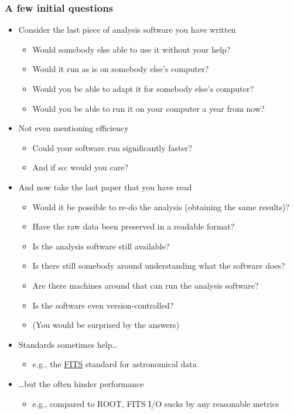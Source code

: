 \documentclass[9pt]{beamer}
\begin{document}
\begin{frame}
  \frametitle{A few initial questions}
  \begin{itemize}
  \item Consider the last piece of analysis software you have written
    \begin{itemize}
    \item Would somebody else able to use it without your help?
    \item Would it run as is on somebody else's computer?
    \item Would you be able to adapt it for somebody else's computer?
    \item Would you be able to run it on your computer a year from now?
    \end{itemize}
  \item Not even mentioning efficiency
    \begin{itemize}
    \item Could your software run significantly faster?
    \item And if so: would you care?
    \end{itemize}
  \item And now take the last paper that you have read
    \begin{itemize}
    \item Would it be possible to re-do the analysis (obtaining the same
      results)?
    \item Have the raw data been preserved in a readable format?
    \item Is the analysis software still available?
    \item Is there still somebody around understanding what the software does?
    \item Are there machines around that can run the analysis software?
    \item Is the software even version-controlled?
    \item \alert{(You would be surprised by the answers)}
    \end{itemize}
  \item Standards sometimes help\ldots
    \begin{itemize}
    \item e.g., the \href{https://fits.gsfc.nasa.gov/fits\_standard.html}{FITS}
      standard for astronomical data
    \end{itemize}
  \item \ldots but the often hinder performance
    \begin{itemize}
    \item e.g., compared to ROOT, FITS I/O sucks by any reasonable metrics
    \end{itemize}
  \end{itemize}
\end{frame}
\end{document}
